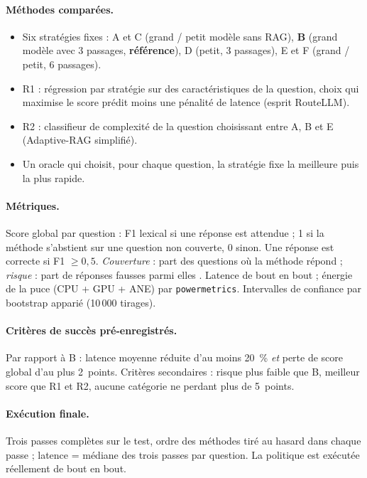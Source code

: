 \documentclass[11pt,a4paper]{article}
\begin{document}
\paragraph{Méthodes comparées.}
\begin{itemize}
\item Six stratégies fixes : A et C (grand / petit modèle sans RAG), \textbf{B} (grand modèle avec
3 passages, \textbf{référence}), D (petit, 3 passages), E et F (grand / petit, 6 passages).
\item R1 : régression par stratégie sur des caractéristiques de la question, choix qui maximise le score
prédit moins une pénalité de latence (esprit RouteLLM).
\item R2 : classifieur de complexité de la question choisissant entre A, B et E (Adaptive-RAG simplifié).
\item Un oracle qui choisit, pour chaque question, la stratégie fixe la meilleure puis la plus rapide.
\end{itemize}

\paragraph{Métriques.} Score global par question : F1 lexical si une réponse est attendue ; 1 si la
méthode s'abstient sur une question non couverte, 0 sinon. Une réponse est correcte si F1 $\ge 0{,}5$.
\emph{Couverture} : part des questions où la méthode répond ; \emph{risque} : part de réponses fausses
parmi elles \citep{kamath2020selective}. Latence de bout en bout ; énergie de la puce (CPU + GPU + ANE)
par \texttt{powermetrics}. Intervalles de confiance par bootstrap apparié (10\,000 tirages).

\paragraph{Critères de succès pré-enregistrés.} Par rapport à B : latence moyenne réduite d'au moins
20~\% \emph{et} perte de score global d'au plus 2~points. Critères secondaires : risque plus faible que
B, meilleur score que R1 et R2, aucune catégorie ne perdant plus de 5~points.

\paragraph{Exécution finale.} Trois passes complètes sur le test, ordre des méthodes tiré au hasard dans
chaque passe ; latence = médiane des trois passes par question. La politique est exécutée réellement de
bout en bout.
\end{document}
